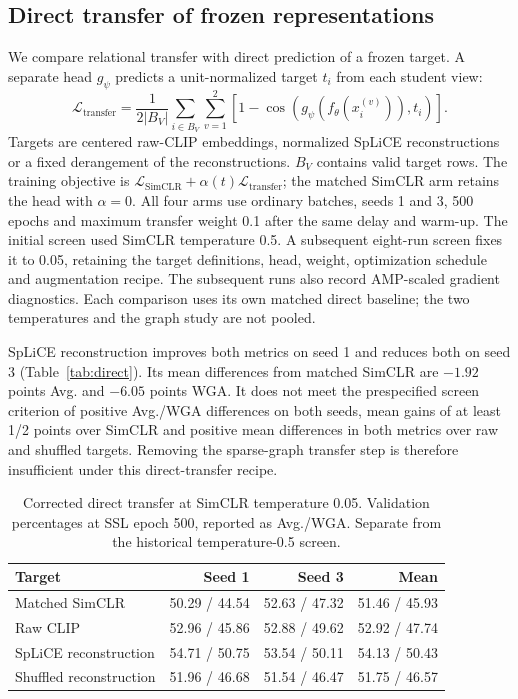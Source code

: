 \documentclass{article}
\begin{document}
\subsection{Direct transfer of frozen representations}
We compare relational transfer with direct prediction of a frozen target.
A separate head $g_\psi$ predicts a unit-normalized target $t_i$ from each
student view:
\begin{equation}
 \mathcal{L}_{\mathrm{transfer}}=
 \frac{1}{2|B_V|}\sum_{i\in B_V}\sum_{v=1}^{2}
 \left[1-\cos\!\left(g_\psi(f_\theta(x_i^{(v)})),t_i\right)\right].
\end{equation}
Targets are centered raw-CLIP embeddings, normalized SpLiCE reconstructions
or a fixed derangement of the reconstructions. $B_V$ contains valid target
rows. The training objective is
$\mathcal{L}_{\mathrm{SimCLR}}+\alpha(t)\mathcal{L}_{\mathrm{transfer}}$;
the matched SimCLR arm retains the head with $\alpha=0$.
All four arms use ordinary batches, seeds 1 and 3, 500 epochs and maximum
transfer weight 0.1 after the same delay and warm-up. The initial screen used
SimCLR temperature 0.5. A subsequent eight-run screen fixes it to 0.05,
retaining the target definitions, head, weight, optimization schedule and
augmentation recipe. The subsequent runs also record AMP-scaled gradient
diagnostics. Each comparison uses its own matched direct baseline; the two
temperatures and the graph study are not pooled.



SpLiCE reconstruction improves both metrics on seed 1 and reduces both on
seed 3 (Table~\ref{tab:direct}). Its mean differences from matched SimCLR
are $-1.92$ points Avg. and $-6.05$ points WGA. It does not meet the
prespecified screen criterion of positive Avg./WGA differences on both seeds,
mean gains of at least 1/2 points over SimCLR and positive mean differences
in both metrics over raw and shuffled targets. Removing the sparse-graph
transfer step is therefore insufficient under this direct-transfer recipe.

\begin{table}[htbp]
\centering\small
\setlength{\tabcolsep}{4pt}
\caption{Corrected direct transfer at SimCLR temperature 0.05. Validation percentages at SSL epoch 500, reported as Avg./WGA. Separate from the historical temperature-0.5 screen.}
\begin{tabular}{lrrr}
\toprule
Target & Seed 1 & Seed 3 & Mean \\
\midrule
Matched SimCLR & 50.29 / 44.54 & 52.63 / 47.32 & 51.46 / 45.93 \\
Raw CLIP & 52.96 / 45.86 & 52.88 / 49.62 & 52.92 / 47.74 \\
SpLiCE reconstruction & 54.71 / 50.75 & 53.54 / 50.11 & 54.13 / 50.43 \\
Shuffled reconstruction & 51.96 / 46.68 & 51.54 / 46.47 & 51.75 / 46.57 \\
\bottomrule
\end{tabular}
\label{tab:direct005}
\end{table}
\end{document}

